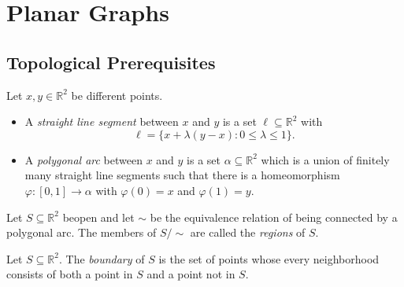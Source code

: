 \chapter{Planar Graphs}
\section{Topological Prerequisites}
\begin{definition}
  Let $x, y \in \mathbb{R}^2$ be different points.
  \begin{itemize}
    \item A \emph{straight line segment} between $x$ and $y$ is a set
    $\ell \subseteq \mathbb{R}^2$ with
    \begin{equation*}
      \ell = \{x + \lambda(y - x): 0 \leq \lambda \leq 1\}.
    \end{equation*}
    \item A \emph{polygonal arc} between $x$ and $y$ is a set $\alpha \subseteq
    \mathbb{R}^2$ which is a union of finitely many straight line segments such
    that there is a homeomorphism $\varphi: [0, 1] \to \alpha$ with $\varphi(0)
    = x$ and $\varphi(1) = y$.
  \end{itemize}
\end{definition}

\begin{definition}
  Let $S \subseteq \mathbb{R}^2$ beopen and let $\sim$ be the equivalence
  relation of being connected by a polygonal arc.
  The members of $S / {\sim}$ are called the \emph{regions} of $S$.
\end{definition}

\begin{definition}
  Let $S \subseteq \mathbb{R}^2$.
  The \emph{boundary} of $S$ is the set of points whose every neighborhood
  consists of both a point in $S$ and a point not in $S$.
\end{definition}

